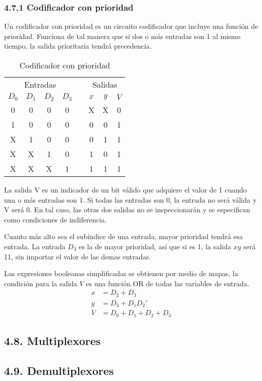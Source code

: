 \subsubsection*{4.7.1 Codificador con prioridad}
Un codificador con prioridad es un circuito codificador que incluye una funci\'{o}n de prioridad. Funciona
de tal manera que si dos o m\'{a}s entradas son 1 al mismo tiempo, la salida prioritaria tendr\'{a} precedencia.

\begin{table}[h]
    \centering
    \begin{tabular}{cccc c ccc}
        \toprule
        \multicolumn{4}{c}{Entradas} &       & \multicolumn{3}{c}{Salidas}                              \\
        \cmidrule{1-4} \cmidrule{6-8}
        $D_0$                        & $D_1$ & $D_2$                       & $D_3$ &  & $x$ & $y$ & $V$ \\
        \midrule
        0                            & 0     & 0                           & 0     &  & X   & X   & 0   \\
        1                            & 0     & 0                           & 0     &  & 0   & 0   & 1   \\
        X                            & 1     & 0                           & 0     &  & 0   & 1   & 1   \\
        X                            & X     & 1                           & 0     &  & 1   & 0   & 1   \\
        X                            & X     & X                           & 1     &  & 1   & 1   & 1   \\
        \bottomrule
    \end{tabular}
    \caption{Codificador con prioridad}
\end{table}

La salida V es un indicador de un bit v\'{a}lido  que adquiere el valor de 1 cuando una o m\'{a}s entradas son 1.
Si todas las entradas son 0, la entrada no ser\'{a} v\'{a}lida y V ser\'{a} 0. En tal caso, las otras dos salidas
no se inspeccionar\'{a}n y se especifican como condiciones de indiferencia.

Cuanto m\'{a}s alto sea el sub\'{i}ndice de una entrada, mayor prioridad tendr\'{a} esa entrada. La entrada $D_3$
es la de mayor prioridad, as\'{i} que si es 1, la salida $xy$ ser\'{a} 11, sin importar el valor de las demas entradas.

Las expresiones booleanas simplificadas se obtienen por medio de mapas, la condici\'{o}n para la salida $V$ es una funci\'{o}n
OR de todas las variables de entrada.
\begin{align*}
    x & = D_2 + D_3             \\
    y & = D_3 + D_1D_2'         \\
    V & = D_0 + D_1 + D_2 + D_3
\end{align*}

\subsection*{4.8. Multiplexores}
\subsection*{4.9. Demultiplexores}
